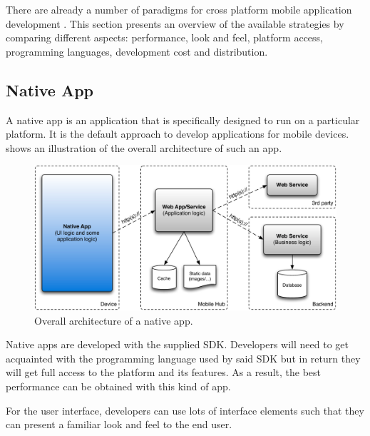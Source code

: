 

There are already a number of paradigms for cross platform mobile application development \citep{Friese}. This section presents an overview of the available strategies by comparing different aspects: performance, look and feel, platform access, programming languages, development cost and distribution.

\subsection{Native App}

A native app is an application that is specifically designed to run on a particular platform. It is the default approach to develop applications for mobile devices.  shows an illustration of the overall architecture of such an app. 

\begin{figure}[h!]
    \begin{center}
        \includegraphics[width=\textwidth]{figs/native.pdf}
        \caption{
            Overall architecture of a native app. 
        }
        \label{fig:native}
    \end{center}
\end{figure}

Native apps are developed with the supplied SDK. Developers will need to get acquainted with the programming language used by said SDK but in return they will get full access to the platform and its features. As a result, the best performance can be obtained with this kind of app.

For the user interface, developers can use lots of interface elements such that they can present a familiar look and feel to the end user. 

